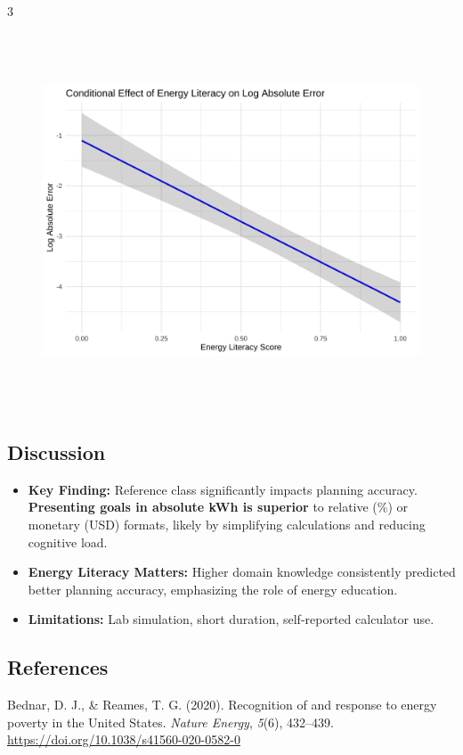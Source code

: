 \documentclass[
  12pt,
]{article}
\newlength{\cslhangindent}
\newenvironment{CSLReferences}[2] %
 {\begin{list}{}{%
  \setlength{\itemindent}{0pt}
  \setlength{\leftmargin}{0pt}
  \setlength{\parsep}{0pt}
  \ifodd #1
   \setlength{\leftmargin}{\cslhangindent}
   \setlength{\itemindent}{-1\cslhangindent}
  \fi
  \setlength{\itemsep}{#2\baselineskip}}}
 {\end{list}}
\providecommand{\tightlist}{%
  \setlength{\itemsep}{0pt}\setlength{\parskip}{0pt}}
\begin{document}
\begin{multicols}{3}
\begin{figure}[H]
{\begin{minipage}[t]{0.44\linewidth}
{    \includegraphics[height=4.4in, keepaspectratio]{assets/images/fig-s2-els-1.png}
    }
  \end{minipage}
}

\end{figure}

\subsection{Discussion}\label{discussion}

\begin{itemize}
\tightlist
\item
  \textbf{Key Finding:} Reference class significantly impacts planning
  accuracy. \textbf{Presenting goals in absolute kWh is superior} to
  relative (\%) or monetary (USD) formats, likely by simplifying
  calculations and reducing cognitive load.
\item
  \textbf{Energy Literacy Matters:} Higher domain knowledge consistently
  predicted better planning accuracy, emphasizing the role of energy
  education.
\item
  \textbf{Limitations:} Lab simulation, short duration, self-reported
  calculator use.
\end{itemize}

\subsection{References}\label{references}

\label{refs}
\begin{CSLReferences}{1}{0}
Bednar, D. J., \& Reames, T. G. (2020). Recognition of and response to
energy poverty in the {United States}. \emph{Nature Energy},
\emph{5}(6), 432--439. \url{https://doi.org/10.1038/s41560-020-0582-0}


\end{CSLReferences}
\end{multicols}
\end{document}
